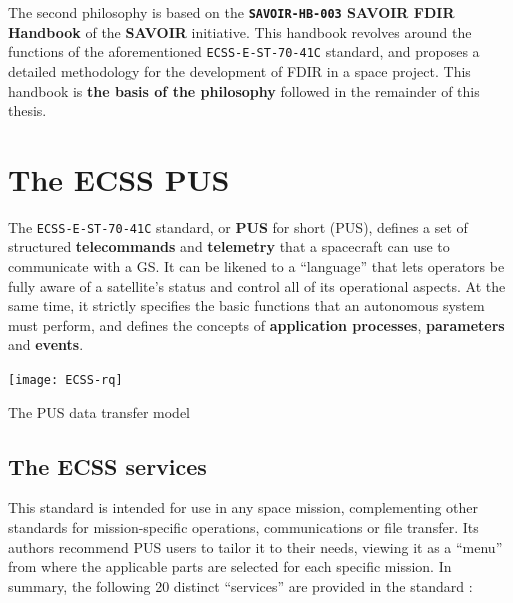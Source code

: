 \documentclass[a4paper,nobib]{tufte-book}
\begin{document}
The second philosophy is based on the \textbf{\texttt{SAVOIR-HB-003} \acs{SAVOIR} \acs{FDIR} Handbook} \autocite{SAVOIR-HB-003} of the \textbf{\acf{SAVOIR}} initiative. This handbook revolves around the functions of the aforementioned \texttt{ECSS-E-ST-70-41C} standard, and proposes a detailed methodology for the development of \ac{FDIR} in a space project. This handbook is \textbf{the basis of the philosophy} followed in the remainder of this thesis.

\section{The \acs{ECSS} \acl{PUS}}
\label{sec:pus}


The \texttt{ECSS-E-ST-70-41C} standard, or \textbf{\acs{PUS}} for short (\acl{PUS}), defines a set of structured \textbf{telecommands} and \textbf{telemetry} that a spacecraft can use to communicate with a \acl{GS}. It can be likened to a ``language'' that lets operators be fully aware of a satellite's status and control all of its operational aspects. At the same time, it strictly specifies the basic functions that an autonomous system must perform, and defines the concepts of \textbf{application processes}, \textbf{parameters} and \textbf{events}.

\begin{marginfigure}
	\texttt{[image: ECSS-rq]}
	\caption{The \ac{PUS} data transfer model}
	\label{fig:pusmodel}
\end{marginfigure}

\subsection{The \acs{ECSS} services}

This standard is intended for use in any space mission, complementing other standards for mission-specific operations, communications or file transfer. Its authors recommend \acs{PUS} users to tailor it to their needs, viewing it as a ``menu'' from where the applicable parts are selected for each specific mission. In summary, the following 20 distinct ``services'' are provided in the standard \autocite{ECSS-E-ST-70-41C,ECSS-E-70-41A,kaufeler_esa_standard_1994}:
\end{document}
